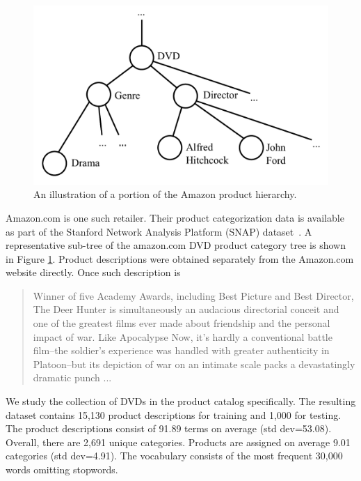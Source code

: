 \begin{figure}[t]
\centering \includegraphics[scale=0.4]{Chapters/chapter1/figures/hi_quality_product_tree_cropped} \caption{An illustration of a portion of the Amazon product hierarchy.}
\label{fig:product_tree}
\end{figure}


Amazon.com is one such retailer.  Their product categorization data is available as part of the 
 Stanford Network Analysis Platform (SNAP) dataset~\cite{SNAP}.    A representative sub-tree of the amazon.com DVD product category tree is shown in Figure \ref{fig:product_tree}.  
Product descriptions were obtained separately from the
Amazon.com website directly. Once such description is
\begin{quote}
{Winner of five Academy Awards, including Best Picture and Best Director, The Deer Hunter 
is simultaneously an audacious directorial conceit and one of the greatest films ever made 
about friendship and the personal impact of war. Like Apocalypse Now, it's hardly a conventional 
battle film--the soldier's experience was handled with greater authenticity in Platoon--but its 
depiction of war on an intimate scale packs a devastatingly dramatic punch ... }
\end{quote}
We study the collection of DVDs
in the product catalog specifically.
The resulting dataset contains 15,130 product descriptions for training and 1,000
for testing. The product descriptions consist of
91.89 terms on average (std dev=53.08). Overall, there are 2,691 unique categories.
Products are assigned on average 9.01 categories (std dev=4.91). The vocabulary
consists of the most frequent 30,000 words omitting stopwords. 

